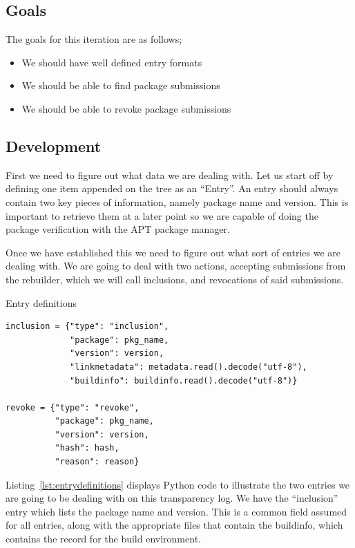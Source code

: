 \documentclass[../Main/thesis.tex]{subfiles}
\begin{document}
\subsection*{Goals}%
\label{sub:fourth_iteration_goals}

The goals for this iteration are as follows;

\begin{itemize}
    \item We should have well defined entry formats
    \item We should be able to find package submissions
    \item We should be able to revoke package submissions
\end{itemize}

\subsection*{Development}%
\label{sub:fourth_iteration_development}
First we need to figure out what data we are dealing with. Let us start off by
defining one item appended on the tree as an ``Entry''. An entry should always
contain two key pieces of information, namely package name and version. This is
important to retrieve them at a later point so we are capable of doing the
package verification with the APT package manager.

Once we have established this we need to figure out what sort of entries we are
dealing with. We are going to deal with two actions, accepting submissions from
the rebuilder, which we will call inclusions, and revocations of said
submissions. 

\begin{listing}[H]
\caption{Entry definitions}
\label{lst:entrydefinitions}
\begin{verbatim}
inclusion = {"type": "inclusion",
             "package": pkg_name,
             "version": version,
             "linkmetadata": metadata.read().decode("utf-8"),
             "buildinfo": buildinfo.read().decode("utf-8")}

revoke = {"type": "revoke",
          "package": pkg_name,
          "version": version,
          "hash": hash,
          "reason": reason}
\end{verbatim}
\end{listing}

Listing~\ref{lst:entrydefinitions} displays Python code to illustrate the
two entries we are going to be dealing with on this transparency log. We have
the ``inclusion'' entry which lists the package name and version. This is a
common field assumed for all entries, along with the appropriate files that
contain the buildinfo, which contains the record for the build environment. 
\end{document}
